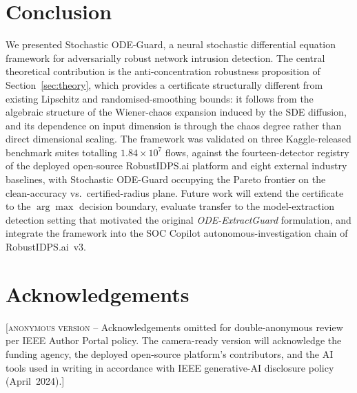 \documentclass[journal,10pt]{IEEEtran}
\theoremstyle{definition}
\theoremstyle{remark}
\begin{document}
\section{Conclusion}\label{sec:conc}
We presented Stochastic ODE-Guard, a neural stochastic differential
equation framework for adversarially robust network intrusion
detection. The central theoretical contribution is the
anti-concentration robustness proposition of
Section~\ref{sec:theory}, which provides a certificate
structurally different from existing Lipschitz and randomised-smoothing
bounds: it follows from the algebraic structure of the Wiener-chaos
expansion induced by the SDE diffusion, and its dependence on input
dimension is through the chaos degree rather than direct dimensional
scaling. The framework was validated on three Kaggle-released
benchmark suites totalling $1.84\times 10^{7}$ flows, against the
fourteen-detector registry of the deployed open-source RobustIDPS.ai
platform and eight external industry baselines, with Stochastic
ODE-Guard occupying the Pareto frontier on the clean-accuracy vs.\
certified-radius plane. Future work will extend the certificate to
the $\arg\max$ decision boundary, evaluate transfer to the model-extraction
detection setting that motivated the original
\textit{ODE-ExtractGuard} formulation, and integrate the framework
into the SOC Copilot autonomous-investigation chain of
RobustIDPS.ai~v3.

\section*{Acknowledgements}
[\textsc{anonymous version} -- Acknowledgements omitted for
double-anonymous review per IEEE Author Portal policy. The
camera-ready version will acknowledge the funding agency, the
deployed open-source platform's contributors, and the AI tools used
in writing in accordance with IEEE generative-AI disclosure policy
(April~2024).]


\end{document}

